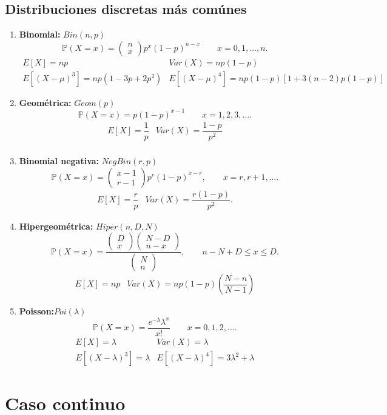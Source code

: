\documentclass[11pt]{report}
\theoremstyle{break}
\theoremstyle{break}
\begin{document}
\subsection{Distribuciones discretas más comúnes}
\label{seccion: distribuciones discretas}
\begin{enumerate}[label=\alph*)]
\item \textbf{Binomial:} $Bin(n,p)$
$$
\mathbb{P}(X=x) = \begin{pmatrix}
n \\
x
\end{pmatrix} p^{x}(1 - p)^{n -x} \qquad x=0,1,\ldots,n.
$$
$$
\begin{matrix}
E[X] = np & Var(X) = np(1-p) \\
E[(X - \mu)^3] = np(1-3p+2p^2) & E[(X - \mu)^4] = np(1-p)[1 + 3(n-2)p(1-p)]
\end{matrix}
$$
\item \textbf{Geométrica:} $Geom(p)$
$$
\mathbb{P}(X = x) = p(1-p)^{x-1} \qquad x=1,2,3,\ldots.
$$
$$
\begin{matrix}
E[X] = \dfrac{1}{p} & Var(X) = \dfrac{1-p}{p^2} \\
\end{matrix}
$$
\item \textbf{Binomial negativa:} $NegBin(r,p)$
$$
\mathbb{P}(X=x) = \begin{pmatrix}
x-1 \\
r-1
\end{pmatrix} p^{r}(1-p)^{x-r}, \qquad x=r,r+1,\ldots.
$$
$$
\begin{matrix}
E[X] = \dfrac{r}{p} & Var(X) = \dfrac{r(1-p)}{p^2}.
\end{matrix}
$$
\item \textbf{Hipergeométrica:} $Hiper(n,D,N)$
$$
\mathbb{P}(X = x) = \dfrac{ \begin{pmatrix}
D \\
x
\end{pmatrix} \begin{pmatrix}
N-D \\
n-x
\end{pmatrix} }{ \begin{pmatrix}
N \\
n
\end{pmatrix}}, \qquad n-N+D \leq x \leq D.
$$
$$
\begin{matrix}
E[X] = np & Var(X) = np(1-p)\left( \dfrac{N-n}{N-1} \right)
\end{matrix}
$$
\item \textbf{Poisson:}$Poi(\lambda)$
$$
\mathbb{P}(X = x) = \dfrac{e^{-\lambda} \lambda^x }{x!} \qquad x=0,1,2,\ldots. 
$$
$$
\begin{matrix}
E[X] = \lambda & Var(X) = \lambda \\
E[(X-\lambda)^3] = \lambda & E[(X - \lambda)^4] = 3\lambda^2 + \lambda
\end{matrix}
$$
\end{enumerate}
\section{Caso continuo}
\label{seccion:variables continuas}
\end{document}
